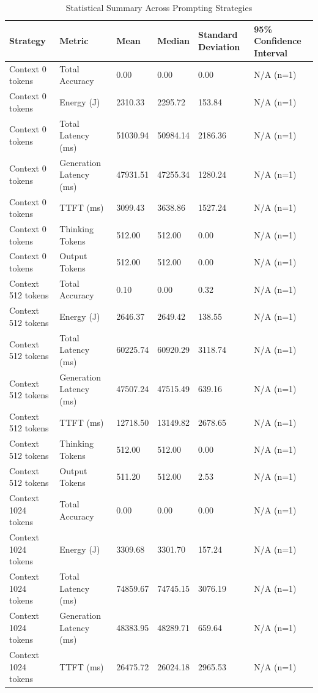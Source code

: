 \begin{table}
\caption{Statistical Summary Across Prompting Strategies}
\label{tab:statistical_summary}
\begin{tabular}{llllll}
\toprule
Strategy & Metric & Mean & Median & Standard Deviation & 95\% Confidence Interval \\
\midrule
Context 0 tokens & Total Accuracy & 0.00 & 0.00 & 0.00 & N/A (n=1) \\
Context 0 tokens & Energy (J) & 2310.33 & 2295.72 & 153.84 & N/A (n=1) \\
Context 0 tokens & Total Latency (ms) & 51030.94 & 50984.14 & 2186.36 & N/A (n=1) \\
Context 0 tokens & Generation Latency (ms) & 47931.51 & 47255.34 & 1280.24 & N/A (n=1) \\
Context 0 tokens & TTFT (ms) & 3099.43 & 3638.86 & 1527.24 & N/A (n=1) \\
Context 0 tokens & Thinking Tokens & 512.00 & 512.00 & 0.00 & N/A (n=1) \\
Context 0 tokens & Output Tokens & 512.00 & 512.00 & 0.00 & N/A (n=1) \\
Context 512 tokens & Total Accuracy & 0.10 & 0.00 & 0.32 & N/A (n=1) \\
Context 512 tokens & Energy (J) & 2646.37 & 2649.42 & 138.55 & N/A (n=1) \\
Context 512 tokens & Total Latency (ms) & 60225.74 & 60920.29 & 3118.74 & N/A (n=1) \\
Context 512 tokens & Generation Latency (ms) & 47507.24 & 47515.49 & 639.16 & N/A (n=1) \\
Context 512 tokens & TTFT (ms) & 12718.50 & 13149.82 & 2678.65 & N/A (n=1) \\
Context 512 tokens & Thinking Tokens & 512.00 & 512.00 & 0.00 & N/A (n=1) \\
Context 512 tokens & Output Tokens & 511.20 & 512.00 & 2.53 & N/A (n=1) \\
Context 1024 tokens & Total Accuracy & 0.00 & 0.00 & 0.00 & N/A (n=1) \\
Context 1024 tokens & Energy (J) & 3309.68 & 3301.70 & 157.24 & N/A (n=1) \\
Context 1024 tokens & Total Latency (ms) & 74859.67 & 74745.15 & 3076.19 & N/A (n=1) \\
Context 1024 tokens & Generation Latency (ms) & 48383.95 & 48289.71 & 659.64 & N/A (n=1) \\
Context 1024 tokens & TTFT (ms) & 26475.72 & 26024.18 & 2965.53 & N/A (n=1) \\

\end{tabular}
\end{table}
